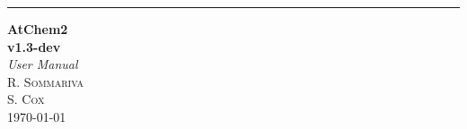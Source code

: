 \documentclass[11pt,a4paper]{report}
\begin{document}
%
%

\begin{titlepage}
  \raggedleft   %
  \rule{1pt}{\textheight}  %
  \hspace{0.05\textwidth}
  \parbox[b]{0.75\textwidth}{
    {\Huge\bfseries AtChem2\\[0.5\baselineskip] v1.3-dev}\\[2\baselineskip]  %
    {\LARGE\textit{User Manual}}\\[4\baselineskip]  %
    {\Large\textsc{R. Sommariva\\S. Cox}}  %
    \vspace{0.5\textheight}\\
    {\noindent \today}\\[\baselineskip]  %
    }

\end{titlepage}


\tableofcontents










\end{document}

